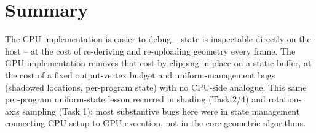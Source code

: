\documentclass[10pt]{article}
\begin{document}

\vspace{-4pt}
\section*{Summary}
The CPU implementation is easier to debug -- state is inspectable directly on the host -- at the cost of re-deriving and re-uploading geometry every frame. The GPU implementation removes that cost by clipping in place on a static buffer, at the cost of a fixed output-vertex budget and uniform-management bugs (shadowed locations, per-program state) with no CPU-side analogue. This same per-program uniform-state lesson recurred in shading (Task 2/4) and rotation-axis sampling (Task 1): most substantive bugs here were in state management connecting CPU setup to GPU execution, not in the core geometric algorithms.
\end{document}
